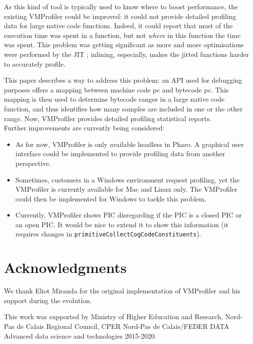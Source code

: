 \documentclass[10pt,nonatbib]{sigplanconf}
\newcommand{\ct}{\lstinline[backgroundcolor=\color{white},basicstyle=\small\ttfamily]}
\begin{document}
As this kind of tool is typically used to know where to boost performance, the existing VMProfiler could be improved: it could not provide detailed profiling data for large native code functions. Indeed, it could report that most of the execution time was spent in a function, but not \textit{where} in this function the time was spent.
This problem was getting significant as more and more optimisations were performed by the JIT ; inlining, especially, makes the jitted functions  harder to accurately profile.

This paper describes a way to address this problem: an API used for debugging purposes offers a mapping between machine code pc and bytecode pc. This mapping is then used to determine bytecode ranges in a large native code function, and thus identifies how many samples are included in one or the other range. Now, VMProfiler provides detailed profiling statistical reports. \\

Further improvements are currently being considered: 
\begin{itemize}
	\item As for now, VMProfiler is only available headless in Pharo. A graphical user interface could be implemented to provide profiling data from another perspective.
	\item Sometimes, customers in a Windows environment request profiling, yet the VMProfiler is currently available for Mac and Linux only. The VMProfiler could then be implemented for Windows to tackle this problem.
	\item Currently, VMProfiler shows PIC disregarding if the PIC is a closed PIC or an open PIC. It would be nice to extend it to show this information (it requires changes in \ct{primitiveCollectCogCodeConstituents}).
\end{itemize}


\section*{Acknowledgments}
We thank Eliot Miranda for the original implementation of VMProfiler and his support during the evolution.

This work was supported by Ministry of Higher Education and Research, Nord-Pas de Calais Regional Council, CPER Nord-Pas de Calais/FEDER DATA Advanced data science and technologies 2015-2020.



%


\end{document}
